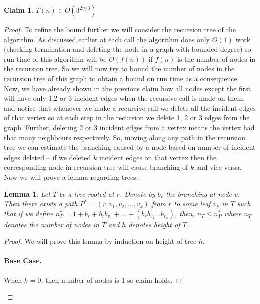 \documentclass[answers]{exam}
\newtheorem{lemma}{Lemma}
\newtheorem{claim}{Claim}
\begin{document}
\begin{questions}
\begin{solution}
\begin{claim}
$T(n) \in O(3^{2n/3})$
\end{claim}
\begin{proof}
To refine the bound further we will consider the recursion tree of the algorithm. As discussed earlier at each call the algorithm does only $O(1)$ work (checking termination and deleting the node in a graph with bounded degree) so run time of this algorithm will be $O(f(n))$ if $f(n)$ is the number of nodes in the recursion tree. So we will now try to bound the number of nodes in the recursion tree of this graph to obtain a bound on run time as a consequence. Now, we have already shown in the previous claim how all nodes except the first will have only 1,2 or 3 incident edges when the recursive call is made on them, and notice that whenever we make a recursive call we delete all the incident edges of that vertex so at each step in the recursion we delete 1, 2 or 3 edges from the graph. Further, deleting 2 or 3 incident edges from a vertex means the vertex had that many neighbours respectively. So, moving along any path in the recursion tree we can estimate the branching caused by a node based on number of incident edges deleted -- if we deleted $k$ incident edges on that vertex then the corresponding node in recursion tree will cause branching of $k$ and vice versa. Now we will prove a lemma regarding trees.
\begin{lemma}
Let $T$ be a tree rooted at $r$. Denote by $b_v$ the branching at node $v$. Then there exists a path $P^* = (r, v_1, v_2, \ldots, v_k)$ from $r$ to some leaf $v_k$ in $T$ such that if we define $n_P^* = 1 + b_r + b_r b_{v_1} + \ldots + (b_r b_{v_1} \ldots b_{v_k})$, then, $n_T \leq n_P^*$ where $n_T$ denotes the number of nodes in $T$ and $h$ denotes height of $T$.
\end{lemma}
\begin{proof}
We will prove this lemma by induction on height of tree $h$.
\paragraph{Base Case.} When $h=0$, then number of nodes is 1 so claim holds.

\end{proof}
\end{proof}
\end{solution}
\end{questions}
\end{document}
